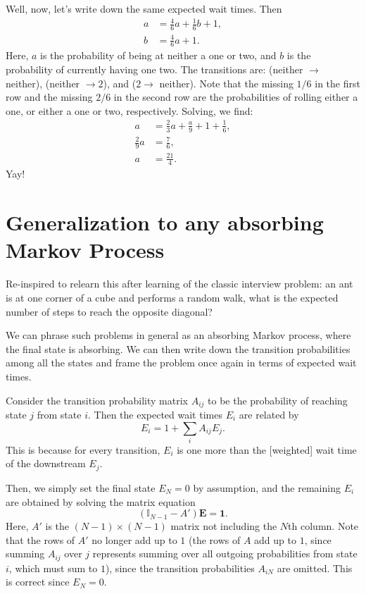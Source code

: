 \documentclass[12pt]{report}
\newcommand*{\bm}[1]{\boldsymbol{\mathbf{#1}}}
\newcommand*{\p}[1]{\left(#1\right)}
\begin{document}
Well, now, let's write down the same expected wait times. Then
\begin{align}
    a &= \frac{4}{6}a + \frac{1}{6}b + 1,\nonumber\\
    b &= \frac{4}{6}a + 1.
\end{align}
Here, $a$ is the probability of being at neither a one or two, and $b$ is the
probability of currently having one two. The transitions are: (neither $\to$
neither), (neither $\to 2$), and ($2 \to$ neither). Note that the missing $1/6$
in the first row and the missing $2/6$ in the second row are the probabilities
of rolling either a one, or either a one or two, respectively. Solving, we find:
\begin{align}
    a &= \frac{2}{3}a + \frac{a}{9} + 1 + \frac{1}{6},\nonumber\\
    \frac{2}{9}a &= \frac{7}{6},\\
    a &= \frac{21}{4}.
\end{align}
Yay!

\section{Generalization to any absorbing Markov Process}

Re-inspired to relearn this after learning of the classic interview problem: an
ant is at one corner of a cube and performs a random walk, what is the expected
number of steps to reach the opposite diagonal?

We can phrase such problems in general as an absorbing Markov process, where the
final state is absorbing. We can then write down the transition probabilities
among all the states and frame the problem once again in terms of expected wait
times.

Consider the transition probability matrix $A_{ij}$ to be the probability of
reaching state $j$ from state $i$. Then the expected wait times $E_i$ are
related by
\begin{equation}
    E_i = 1 + \sum\limits_i A_{ij}E_j.
\end{equation}
This is because for every transition, $E_i$ is one more than the [weighted] wait
time of the downstream $E_j$.

Then, we simply set the final state $E_N = 0$ by assumption, and the remaining
$E_i$ are obtained by solving the matrix equation
\begin{equation}
    \p{\mathbb{I}_{N - 1} - A'}\bm{E} = \bm{1}.
\end{equation}
Here, $A'$ is the $\p{N - 1}\times(N-1)$ matrix not including the $N$th column.
Note that the rows of $A'$ no longer add up to $1$ (the rows of $A$ add up to
$1$, since summing $A_{ij}$ over $j$ represents summing over all outgoing
probabilities from state $i$, which must sum to $1$), since the transition
probabilities $A_{iN}$ are omitted. This is correct since $E_N = 0$.
\end{document}
